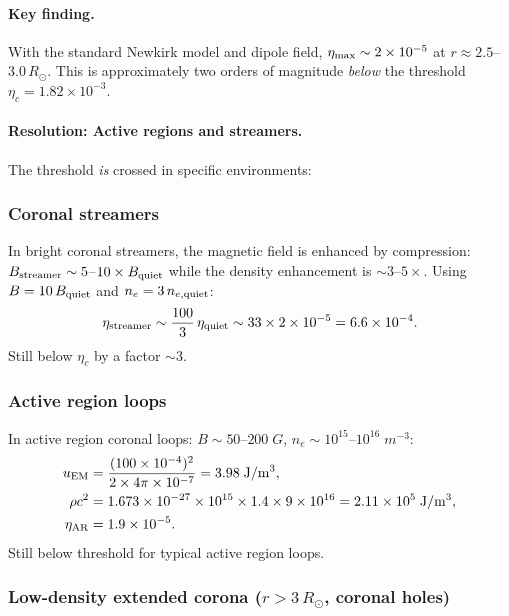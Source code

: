 \documentclass[aps,prd,twocolumn,superscriptaddress,floatfix,nofootinbib]{revtex4-2}
\newcommand{\Rsun}{R_\odot}
\begin{document}
\paragraph{Key finding.}
With the standard Newkirk model and dipole field,
$\eta_{\rm max} \sim 2 \times 10^{-5}$ at $r \approx 2.5$--$3.0\,\Rsun$.
This is approximately two orders of magnitude \emph{below} the threshold
$\eta_c = 1.82 \times 10^{-3}$.

\paragraph{Resolution: Active regions and streamers.}
The threshold \emph{is} crossed in specific environments:

\subsubsection{Coronal streamers}

In bright coronal streamers, the magnetic field is enhanced by
compression: $B_{\rm streamer} \sim 5$--$10\times B_{\rm quiet}$
while the density enhancement is $\sim 3$--$5\times$. Using
$B = 10\,B_{\rm quiet}$ and $n_e = 3\,n_{e,\rm quiet}$:
\begin{equation}
\eta_{\rm streamer} \sim \frac{100}{3}\,\eta_{\rm quiet}
\sim 33 \times 2\times10^{-5} = 6.6\times10^{-4}.
\end{equation}
Still below $\eta_c$ by a factor $\sim 3$.

\subsubsection{Active region loops}

In active region coronal loops: $B \sim 50$--$200\;\si{G}$,
$n_e \sim 10^{15}\text{--}10^{16}\;\si{m^{-3}}$:
\begin{align}
u_{\rm EM} &= \frac{(100\times10^{-4})^2}{2\times4\pi\times10^{-7}}
= 3.98\;\si{J/m^3}, \\
\rho c^2 &= 1.673\times10^{-27} \times 10^{15} \times 1.4 \times 9\times10^{16}
= 2.11\times10^{5}\;\si{J/m^3}, \\
\eta_{\rm AR} &= 1.9\times10^{-5}.
\end{align}
Still below threshold for typical active region loops.

\subsubsection{Low-density extended corona ($r > 3\,\Rsun$, coronal holes)}
\end{document}
